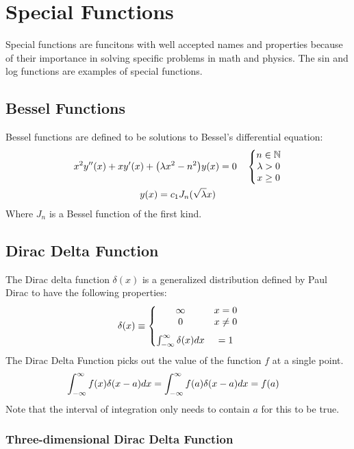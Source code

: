 \section{Special Functions}  
    Special functions are funcitons with well accepted names and properties because of their importance in solving specific problems in math and physics. The sin and log functions are examples of special functions. 
    \subsection{Bessel Functions}
        Bessel functions are defined to be solutions to Bessel's differential equation:
        \begin{gather}
            x^2y''(x)+xy'(x)+\qty(\lambda x^2-n^2)y(x)=0\quad\left\{ \begin{gathered} \begin{matrix}  n\in\mathbb{N}\\\lambda>0\\x\geq0 \end{matrix} \end{gathered} \right.
            \\
            y(x)=c_1J_n(\sqrt{\lambda}x)
        \end{gather}
        Where $J_n$ is a Bessel function of the first kind. 
    \subsection{Dirac Delta Function}
        The Dirac delta function $\delta(x)$ is a generalized distribution defined by Paul Dirac to have the following properties:
        \begin{align*}
            \delta(x)\equiv\left\{ \begin{gathered} \begin{matrix} 
            \infty & x=0
            \\
            0 & x\neq 0
            \\[0.25 cm]
            \int_{-\infty}^\infty \delta(x) dx &= 1 \end{matrix} \end{gathered} \right.
        \end{align*}
        The Dirac Delta Function picks out the value of the function $f$ at a single point.
        \begin{align*}
            \int_{-\infty}^{\infty} f(x) \delta(x-a) dx =\int_{-\infty}^{\infty} f(a) \delta(x-a)dx
            &= f(a)
        \end{align*}
        Note that the interval of integration only needs to contain $a$ for this to be true. 
        \subsubsection*{Three-dimensional Dirac Delta Function}
            
